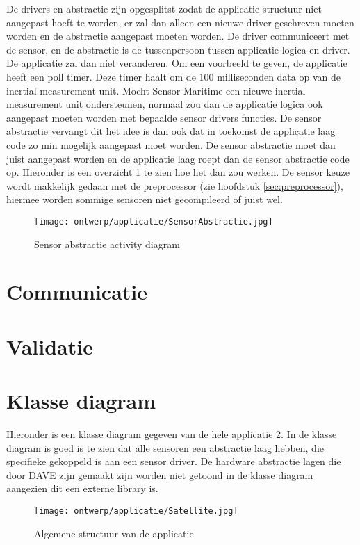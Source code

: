 \noindent De drivers en abstractie zijn opgesplitst zodat de applicatie structuur niet aangepast hoeft te worden, er zal dan alleen een nieuwe driver geschreven moeten worden en de abstractie aangepast moeten worden. De driver communiceert met de sensor, en de abstractie is de tussenpersoon tussen applicatie logica en driver. De applicatie zal dan niet veranderen. Om een voorbeeld te geven, de applicatie heeft een poll timer. Deze timer haalt om de 100 milliseconden data op van de inertial measurement unit. Mocht Sensor Maritime een nieuwe inertial measurement unit ondersteunen, normaal zou dan de applicatie logica ook aangepast moeten worden met bepaalde sensor drivers functies. De sensor abstractie vervangt dit het idee is dan ook dat in toekomst de applicatie laag code zo min mogelijk aangepast moet worden. De sensor abstractie moet dan juist aangepast worden en de applicatie laag roept dan de sensor abstractie code op. Hieronder is een overzicht \ref{fig:SensorAbstractie} te zien hoe het dan zou werken. De sensor keuze wordt makkelijk gedaan met de preprocessor (zie hoofdstuk \ref{sec:preprocessor}), hiermee worden sommige sensoren niet gecompileerd of juist wel.
\begin{figure}[h!]
	\centering
	\label{fig:SensorAbstractie}

	\texttt{[image: ontwerp/applicatie/SensorAbstractie.jpg]}
	\caption{Sensor abstractie activity diagram}
\end{figure}
	
	
\newpage
\section{Communicatie}

\newpage

\newpage
\section{Validatie}


\newpage
\section{Klasse diagram}
Hieronder is een klasse diagram gegeven van de hele applicatie \ref{fig:klassediagram}. In de klasse diagram is goed is te zien dat alle sensoren een abstractie laag hebben, die specifieke gekoppeld is aan een sensor  driver. De hardware abstractie lagen die door DAVE zijn gemaakt zijn worden niet getoond in de klasse diagram aangezien dit een externe library is.
\begin{figure}[h!]
	\centering
	\label{fig:klassediagram}

	\texttt{[image: ontwerp/applicatie/Satellite.jpg]}
	\caption{Algemene structuur van de applicatie}
\end{figure}
